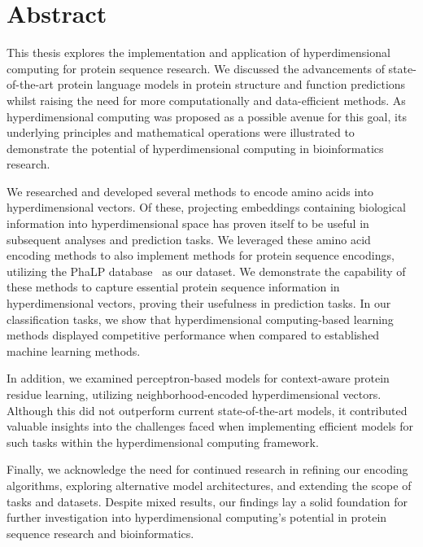 \chapter{Abstract}
This thesis explores the implementation and application of hyperdimensional computing for protein sequence research. We discussed the advancements of state-of-the-art protein language models in protein structure and function predictions whilst raising the need for more computationally and data-efficient methods. As hyperdimensional computing was proposed as a possible avenue for this goal, its underlying principles and mathematical operations were illustrated to demonstrate the potential of hyperdimensional computing in bioinformatics research.

We researched and developed several methods to encode amino acids into hyperdimensional vectors. Of these, projecting embeddings containing biological information into hyperdimensional space has proven itself to be useful in subsequent analyses and prediction tasks. We leveraged these amino acid encoding methods to also implement methods for protein sequence encodings, utilizing the PhaLP database~\cite{phalp} as our dataset. We demonstrate the capability of these methods to capture essential protein sequence information in hyperdimensional vectors, proving their usefulness in prediction tasks. In our classification tasks, we show that hyperdimensional computing-based learning methods displayed competitive performance when compared to established machine learning methods.

In addition, we examined perceptron-based models for context-aware protein residue learning, utilizing neighborhood-encoded hyperdimensional vectors. Although this did not outperform current state-of-the-art models, it contributed valuable insights into the challenges faced when implementing efficient models for such tasks within the hyperdimensional computing framework.

Finally, we acknowledge the need for continued research in refining our encoding algorithms, exploring alternative model architectures, and extending the scope of tasks and datasets. Despite mixed results, our findings lay a solid foundation for further investigation into hyperdimensional computing's potential in protein sequence research and bioinformatics.